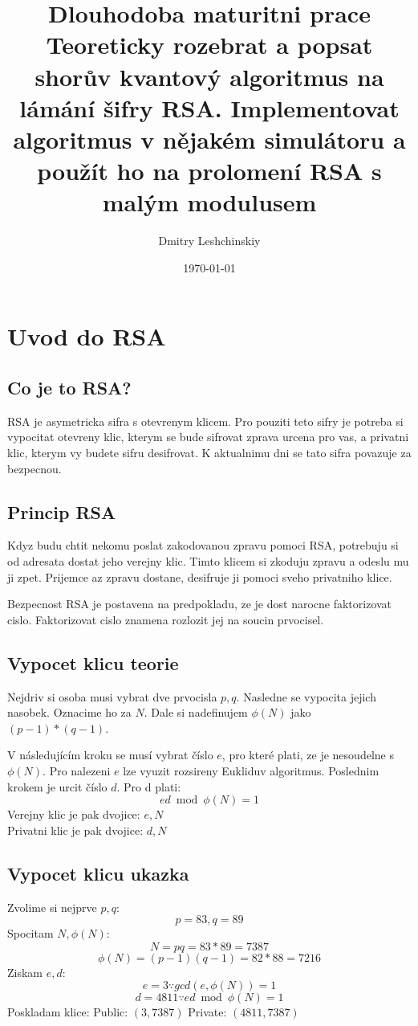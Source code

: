 \documentclass[12pt]{article}
\title{Dlouhodoba maturitni prace \\
\large Teoreticky rozebrat a popsat shorův kvantový algoritmus na lámání šifry RSA. Implementovat algoritmus v nějakém simulátoru a použít ho na prolomení RSA s malým modulusem}
\author{Dmitry Leshchinskiy}
\date{\today}
\begin{document}
\maketitle
\newpage

\tableofcontents
\newpage

\section{Uvod do RSA}
\subsection{Co je to RSA?}

RSA je asymetricka sifra s otevrenym klicem. Pro pouziti teto sifry je potreba si vypocitat otevreny klic, kterym se bude sifrovat zprava urcena pro vas, a privatni klic, kterym vy budete sifru desifrovat. K aktualnimu dni se tato sifra povazuje za bezpecnou.

\subsection{Princip RSA}
Kdyz budu chtit nekomu poslat zakodovanou zpravu pomoci RSA, potrebuju si od adresata dostat jeho verejny klic. Timto klicem si zkoduju zpravu a odeslu mu ji zpet. Prijemce az zpravu dostane, desifruje ji pomoci sveho privatniho klice.
\par Bezpecnost RSA je postavena na predpokladu, ze je dost narocne faktorizovat cislo. Faktorizovat cislo znamena rozlozit jej na soucin prvocisel.

\subsection{Vypocet klicu teorie}
Nejdriv si osoba musi vybrat dve prvocisla $p, q$.
Nasledne se vypocita jejich nasobek. Oznacime ho za $N$.
Dale si nadefinujem $\phi (N)$ jako $(p - 1) * (q - 1)$.
\par V následujícím kroku se musí vybrat číslo $e$, pro které plati, ze je nesoudelne s $\phi (N)$.
Pro nalezeni $e$ lze vyuzit rozsireny Eukliduv algoritmus.
Poslednim krokem je urcit číslo $d$. Pro d plati:
$$ ed \bmod \phi (N) = 1 $$
Verejny klic je pak dvojice: $e, N$ \\
Privatni klic je pak dvojice: $d, N$

\subsection{Vypocet klicu ukazka}
\noindent Zvolime si nejprve $p, q$:
$$p = 83, q = 89$$
Spocitam $N, \phi (N)$:
$$N = pq = 83 * 89 = 7387$$
$$\phi (N) = (p - 1)(q - 1) = 82 * 88 = 7216$$
Ziskam $e, d$:
$$e = 3 \because gcd(e, \phi (N)) = 1$$
$$d = 4811 \because ed \bmod \phi (N) = 1$$
Poskladam klice:
Public: $(3, 7387)$
Private: $(4811, 7387)$
\end{document}
